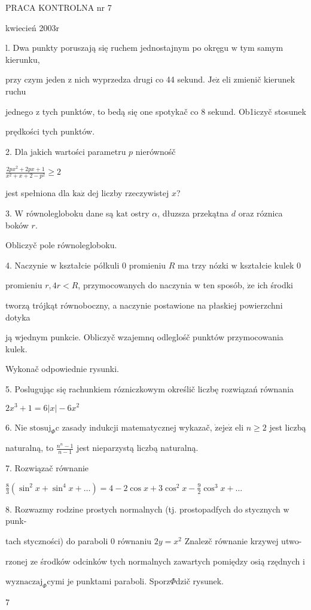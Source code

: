 \documentclass[a4paper,12pt]{article}
\begin{document}
PRACA KONTROLNA nr 7

kwiecień 2003r

l. Dwa punkty poruszają się ruchem jednostajnym po okręgu $\mathrm{w}$ tym samym kierunku,

przy czym jeden $\mathrm{z}$ nich wyprzedza drugi co 44 sekund. $\mathrm{J}\mathrm{e}\dot{\mathrm{z}}$ eli zmienič kierunek ruchu

jednego $\mathrm{z}$ tych punktów, to bedą się one spotykač co 8 sekund. Ob1iczyč stosunek

prędkości tych punktów.

2. Dla jakich wartości parametru $p$ nierównośč

$\displaystyle \frac{2px^{2}+2px+1}{x^{2}+x+2-p^{2}}\geq 2$

jest spełniona dla $\mathrm{k}\mathrm{a}\dot{\mathrm{z}}$ dej liczby rzeczywistej $x$?

3. $\mathrm{W}$ równolegloboku dane są $\mathrm{k}\mathrm{a}\mathrm{t}$ ostry $\alpha$, dłuzsza przekątna $d$ oraz róznica boków $r.$

Obliczyč pole równolegloboku.

4. Naczynie $\mathrm{w}$ kształcie półkuli $0$ promieniu $R$ ma trzy nózki $\mathrm{w}$ kształcie kulek $0$

promieniu $r, 4r < R$, przymocowanych do naczynia $\mathrm{w}$ ten sposób, $\dot{\mathrm{z}}\mathrm{e}$ ich środki

tworzą trójkąt równoboczny, a naczynie postawione na płaskiej powierzchni dotyka

ją wjednym punkcie. Obliczyč wzajemnq odleglośč punktów przymocowania kulek.

Wykonač odpowiednie rysunki.

5. Poslugując się rachunkiem rózniczkowym określič liczbę rozwiązań równania

$2x^{3}+1=6|x|-6x^{2}$

6. Nie $\mathrm{s}\mathrm{t}\mathrm{o}\mathrm{s}\mathrm{u}\mathrm{j}_{\Phi}\mathrm{c}$ zasady indukcji matematycznej wykazač, $\dot{\mathrm{z}}\mathrm{e}\mathrm{j}\mathrm{e}\dot{\mathrm{z}}$ eli $n \geq 2$ jest liczbą

naturalną, to $\displaystyle \frac{n^{n}-1}{n-1}$ jest nieparzystą liczbą naturalną.

7. Rozwiązač równanie

$\displaystyle \frac{8}{3}(\sin^{2}x+\sin^{4}x+\ldots)=4-2\cos x+3\cos^{2}x-\frac{9}{2}\cos^{3}x+\ldots$

8. Rozwazmy rodzine prostych normalnych (tj. prostopadfych do stycznych $\mathrm{w}$ punk-

tach styczności) do paraboli $0$ równaniu $2y=x^{2}$ Znalez$\acute{}$č równanie krzywej utwo-

rzonej ze środków odcinków tych normalnych zawartych pomiędzy osią rzędnych $\mathrm{i}$

$\mathrm{w}\mathrm{y}\mathrm{z}\mathrm{n}\mathrm{a}\mathrm{c}\mathrm{z}\mathrm{a}\mathrm{j}_{\Phi}$cymi je punktami paraboli. Sporz$\Phi$dzič rysunek.

7
\end{document}
